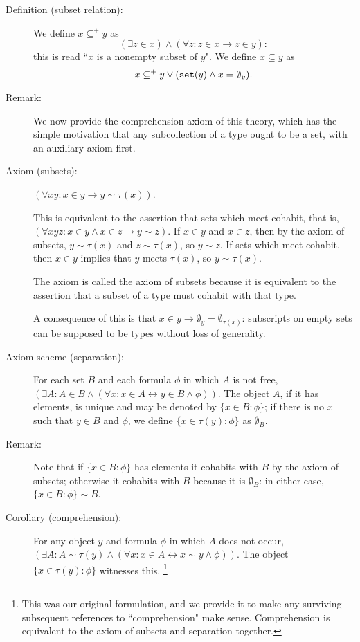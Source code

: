 \documentclass[12pt]{article}
\begin{document}
\begin{description}
\item[Definition (subset relation):]  We define $x \subseteq^+ y$ as $$(\exists z \in x) \wedge (\forall z:z \in x \rightarrow z \in y):$$ this is read ``$x$ is a nonempty subset of $y$".   We define $x \subseteq y$ as $$x \subseteq^+ y \vee ({\tt set}(y) \wedge x = \emptyset_y).$$

\item[Remark:]  We now provide the comprehension axiom of this theory, which has the simple motivation that any subcollection of a type ought to be a set, with an auxiliary axiom first.

\item[Axiom (subsets):]  $(\forall xy:x \in y \rightarrow y \sim \tau(x))$.  

This is equivalent to the assertion that sets which meet cohabit, that is, $(\forall xyz:x \in y \wedge x \in z \rightarrow y \sim z)$.  If $x \in y$ and $x \in z$, then by the axiom of subsets, $y \sim \tau(x)$ and $z \sim \tau(x)$, so $y \sim z$.  If sets which meet cohabit, then $x \in y$ implies that $y$ meets $\tau(x)$, so $y \sim \tau(x)$.

The axiom is called the axiom of subsets because it is equivalent to the assertion that a subset of a type must cohabit with that type.

A consequence of this is that $x \in y \rightarrow \emptyset_y = \emptyset_{\tau(x)}$:  subscripts on empty sets can be supposed to be types without loss of generality.

\item[Axiom scheme (separation):]  For each set $B$ and each formula $\phi$ in which $A$ is not free, $(\exists A:A \in B \wedge (\forall x:x \in A \leftrightarrow y \in B\wedge \phi))$.  The object $A$, if it has elements, is unique and may be denoted by $\{x \in B:\phi\}$; if there is no $x$ such that $y \in B$ and $\phi$, we define $\{x \in \tau(y):\phi\}$ as
$\emptyset_{B}$.

\item[Remark:]  Note that if $\{x \in B:\phi\}$ has elements it cohabits with $B$ by the axiom of subsets; otherwise it cohabits with $B$ because it is $\emptyset_B$:  in either case, $\{x \in B:\phi\} \sim B$.

\item[Corollary (comprehension):]  For any object $y$ and formula $\phi$ in which $A$ does not occur,
$(\exists A:A \sim \tau(y) \wedge (\forall x:x \in A \leftrightarrow x \sim y \wedge \phi))$.  The object $\{x \in \tau(y):\phi\}$ witnesses this.  \footnote{This was our original formulation, and we provide it to make any surviving subsequent references to ``comprehension" make sense.   Comprehension is equivalent to the axiom of subsets and separation together.}


\end{description}
\end{document}
